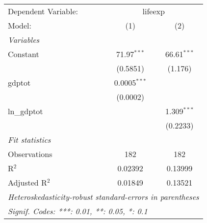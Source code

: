 
\begingroup
\centering
\begin{tabular}{lcc}
   \tabularnewline \midrule \midrule
   Dependent Variable: & \multicolumn{2}{c}{lifeexp}\\
   Model:         & (1)            & (2)\\  
   \midrule
   \emph{Variables}\\
   Constant       & 71.97$^{***}$  & 66.61$^{***}$\\   
                  & (0.5851)       & (1.176)\\   
   gdptot         & 0.0005$^{***}$ &   \\   
                  & (0.0002)       &   \\   
   ln\_gdptot     &                & 1.309$^{***}$\\   
                  &                & (0.2233)\\   
   \midrule
   \emph{Fit statistics}\\
   Observations   & 182            & 182\\  
   R$^2$          & 0.02392        & 0.13999\\  
   Adjusted R$^2$ & 0.01849        & 0.13521\\  
   \midrule \midrule
   \multicolumn{3}{l}{\emph{Heteroskedasticity-robust standard-errors in parentheses}}\\
   \multicolumn{3}{l}{\emph{Signif. Codes: ***: 0.01, **: 0.05, *: 0.1}}\\
\end{tabular}
\par\endgroup



